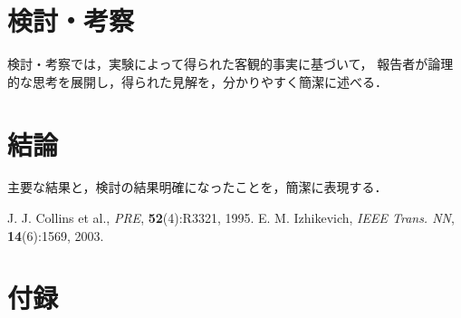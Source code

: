 \documentclass[12pt]{jarticle}
\begin{document}
\section{検討・考察}
検討・考察では，実験によって得られた客観的事実に基づいて，
報告者が論理的な思考を展開し，得られた見解を，分かりやすく簡潔に述べる．

\section{結論}
主要な結果と，検討の結果明確になったことを，簡潔に表現する．

\begin{thebibliography}{99}
\label{sannkoubunnkenn_chapter}
	 J. J. Collins et al.,
	 {\em PRE}, {\bf 52}(4):R3321, 1995.
  E. M. Izhikevich, 
	 {\em IEEE Trans. NN}, {\bf 14}(6):1569, 2003. 
\end{thebibliography}

\clearpage
\appendix
\section{付録}
\end{document}
